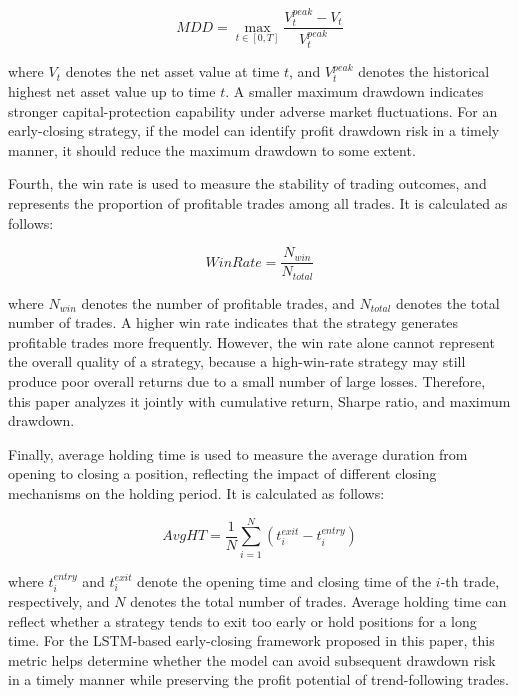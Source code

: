\documentclass[12pt]{article}
\begin{document}
\begin{equation}
    MDD = \max_{t \in [0,T]} \frac{V^{peak}_t - V_t}{V^{peak}_t}
\end{equation}

where $V_t$ denotes the net asset value at time $t$, and $V^{peak}_t$ denotes the historical 
highest net asset value up to time $t$. A smaller maximum drawdown indicates stronger 
capital-protection capability under adverse market fluctuations. For an early-closing strategy, if the model can identify profit drawdown risk in a timely manner, it should reduce the maximum drawdown to some extent.

Fourth, the win rate is used to measure the stability of trading outcomes, and represents the 
proportion of profitable trades among all trades. It is calculated as follows:

\begin{equation}
    WinRate = \frac{N_{win}}{N_{total}}
\end{equation}

where $N_{win}$ denotes the number of profitable trades, and $N_{total}$ denotes the total 
number of trades. A higher win rate indicates that the strategy generates profitable trades 
more frequently. However, the win rate alone cannot represent the overall quality of a 
strategy, because a high-win-rate strategy may still produce poor overall returns due to a 
small number of large losses. Therefore, this paper analyzes it jointly with cumulative return, 
Sharpe ratio, and maximum drawdown.

Finally, average holding time is used to measure the average duration from opening to closing 
a position, reflecting the impact of different closing mechanisms on the holding period. It is 
calculated as follows:

\begin{equation}
    AvgHT = \frac{1}{N} \sum_{i=1}^{N} \left(t^{exit}_i - t^{entry}_i\right)
\end{equation}

where $t^{entry}_i$ and $t^{exit}_i$ denote the opening time and closing time of the $i$-th 
trade, respectively, and $N$ denotes the total number of trades. Average holding time can 
reflect whether a strategy tends to exit too early or hold positions for a long time. For the 
LSTM-based early-closing framework proposed in this paper, this metric helps determine whether 
the model can avoid subsequent drawdown risk in a timely manner while preserving the profit 
potential of trend-following trades.
\end{document}
